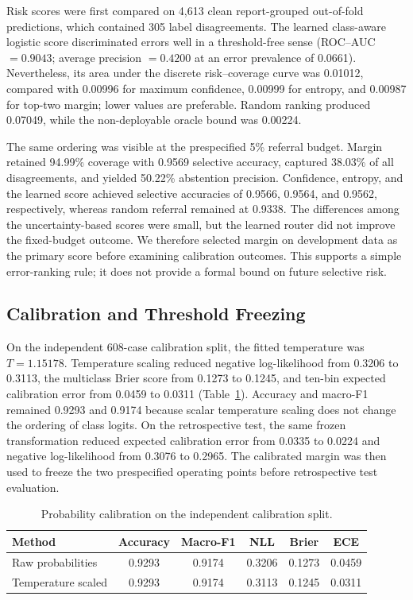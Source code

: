 \documentclass[11pt]{article}
\begin{document}
Risk scores were first compared on 4,613 clean report-grouped out-of-fold
predictions, which contained 305 label disagreements. The learned class-aware
logistic score discriminated errors well in a threshold-free sense
(ROC--AUC $=0.9043$; average precision $=0.4200$ at an error prevalence of
0.0661). Nevertheless, its area under the discrete risk--coverage curve was
0.01012, compared with 0.00996 for maximum confidence, 0.00999 for entropy,
and 0.00987 for top-two margin; lower values are preferable. Random ranking
produced 0.07049, while the non-deployable oracle bound was 0.00224.

The same ordering was visible at the prespecified 5\% referral budget. Margin
retained 94.99\% coverage with 0.9569 selective accuracy, captured 38.03\% of
all disagreements, and yielded 50.22\% abstention precision. Confidence,
entropy, and the learned score achieved selective accuracies of 0.9566, 0.9564,
and 0.9562, respectively, whereas random referral remained at 0.9338. The
differences among the uncertainty-based scores were small, but the learned
router did not improve the fixed-budget outcome. We therefore selected margin
on development data as the primary score before examining calibration outcomes.
This supports a simple error-ranking rule; it does not provide a formal bound on
future selective risk.

\subsection{Calibration and Threshold Freezing}

On the independent 608-case calibration split, the fitted temperature was
$T=1.15178$. Temperature scaling reduced negative log-likelihood from 0.3206 to
0.3113, the multiclass Brier score from 0.1273 to 0.1245, and ten-bin expected
calibration error from 0.0459 to 0.0311 (Table~\ref{tab:calibration}). Accuracy
and macro-F1 remained 0.9293 and 0.9174 because scalar temperature scaling does
not change the ordering of class logits. On the retrospective test, the same
frozen transformation reduced expected calibration error from 0.0335 to 0.0224
and negative log-likelihood from 0.3076 to 0.2965. The calibrated margin was then
used to freeze the two prespecified operating points before retrospective test
evaluation.

\begin{table}[t]
  \centering
  \caption{Probability calibration on the independent calibration split.}
  \label{tab:calibration}
  \begin{tabular}{lccccc}
    \toprule
    Method & Accuracy & Macro-F1 & NLL & Brier & ECE \\
    \midrule
    Raw probabilities & 0.9293 & 0.9174 & 0.3206 & 0.1273 & 0.0459 \\
    Temperature scaled & 0.9293 & 0.9174 & 0.3113 & 0.1245 & 0.0311 \\
    \bottomrule
  \end{tabular}
\end{table}
\end{document}
